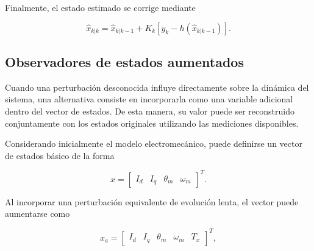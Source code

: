 Finalmente, el estado estimado se corrige mediante

\begin{equation}
\hat{x}_{k|k}
=
\hat{x}_{k|k-1}
+
K_k
\left[
y_k-h(\hat{x}_{k|k-1})
\right].
\end{equation}

%
%



\subsection{Observadores de estados aumentados}

%
%
%
%
%
%

Cuando una perturbación desconocida influye directamente sobre la dinámica 
del sistema, una alternativa consiste en incorporarla como una variable 
adicional dentro del vector de estados. De esta manera, su valor puede ser 
reconstruido conjuntamente con los estados originales utilizando las 
mediciones disponibles.

Considerando inicialmente el modelo electromecánico, puede definirse un vector 
de estados básico de la forma

\begin{equation}
x =
\begin{bmatrix}
I_d &
I_q &
\theta_m &
\omega_m
\end{bmatrix}^{T}.
\end{equation}

Al incorporar una perturbación equivalente de evolución lenta, el vector puede 
aumentarse como

\begin{equation}
x_a =
\begin{bmatrix}
I_d &
I_q &
\theta_m &
\omega_m &
T_x
\end{bmatrix}^{T},
\end{equation}

